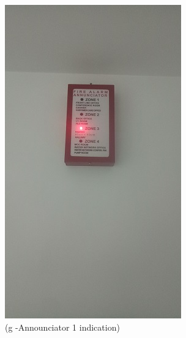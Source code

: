 \begin{figure}
\begin{minipage}[b]{0.25\linewidth}
	\includegraphics[width=\textwidth]{figures/R1P_fdas/announciator1.jpg}
	\caption*{(g -Announciator 1 indication)}
\end{minipage}
	\hspace{0.05cm}
\begin{minipage}[b]{0.25\linewidth}
	\centering

\end{minipage}
\end{figure}
